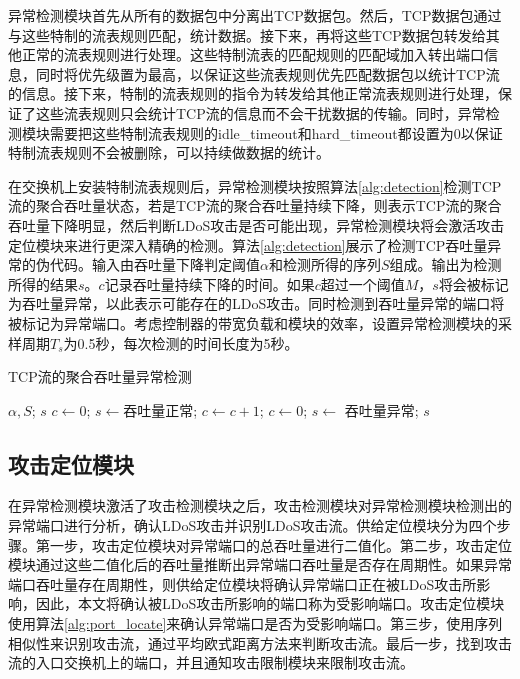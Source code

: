 异常检测模块首先从所有的数据包中分离出TCP数据包。然后，TCP数据包通过与这些特制的流表规则匹配，统计数据。接下来，再将这些TCP数据包转发给其他正常的流表规则进行处理。这些特制流表的匹配规则的匹配域加入转出端口信息，同时将优先级置为最高，以保证这些流表规则优先匹配数据包以统计TCP流的信息。接下来，特制的流表规则的指令为转发给其他正常流表规则进行处理，保证了这些流表规则只会统计TCP流的信息而不会干扰数据的传输。同时，异常检测模块需要把这些特制流表规则的idle\_timeout和hard\_timeout都设置为0以保证特制流表规则不会被删除，可以持续做数据的统计。

在交换机上安装特制流表规则后，异常检测模块按照算法\ref{alg:detection}检测TCP流的聚合吞吐量状态，若是TCP流的聚合吞吐量持续下降，则表示TCP流的聚合吞吐量下降明显，然后判断LDoS攻击是否可能出现，异常检测模块将会激活攻击定位模块来进行更深入精确的检测。算法\ref{alg:detection}展示了检测TCP吞吐量异常的伪代码。输入由吞吐量下降判定阈值$\alpha$和检测所得的序列$S$组成。输出为检测所得的结果$s$。$c$记录吞吐量持续下降的时间。如果$c$超过一个阈值$M$，$s$将会被标记为吞吐量异常，以此表示可能存在的LDoS攻击。同时检测到吞吐量异常的端口将被标记为异常端口。考虑控制器的带宽负载和模块的效率，设置异常检测模块的采样周期$T_s$为0.5秒，每次检测的时间长度为5秒。

\renewcommand{\algorithmicrequire}{\textbf{输入:}}
\renewcommand{\algorithmicensure}{\textbf{输出:}}
\begin{algorithm}
	\small
	\caption{TCP流的聚合吞吐量异常检测}
	\label{alg:detection}
	\begin{algorithmic}[1]%
	\Require $\alpha, S$;
	\Ensure $s$
	\State $c \gets 0$;
	\State $s \gets $吞吐量正常;
			\State $c \gets c + 1$;
		\Else 
			\State $c \gets 0$;
		\EndIf
			\State $s \gets$ 吞吐量异常;
		\EndIf
	\EndFor
	\State \Return $s$
		
	\end{algorithmic}
\end{algorithm}

\subsection{攻击定位模块}
\label{chap4:Locator}

在异常检测模块激活了攻击检测模块之后，攻击检测模块对异常检测模块检测出的异常端口进行分析，确认LDoS攻击并识别LDoS攻击流。供给定位模块分为四个步骤。第一步，攻击定位模块对异常端口的总吞吐量进行二值化。第二步，攻击定位模块通过这些二值化后的吞吐量推断出异常端口吞吐量是否存在周期性。如果异常端口吞吐量存在周期性，则供给定位模块将确认异常端口正在被LDoS攻击所影响，因此，本文将确认被LDoS攻击所影响的端口称为受影响端口。攻击定位模块使用算法\ref{alg:port_locate}来确认异常端口是否为受影响端口。第三步，使用序列相似性来识别攻击流，通过平均欧式距离方法来判断攻击流。最后一步，找到攻击流的入口交换机上的端口，并且通知攻击限制模块来限制攻击流。




